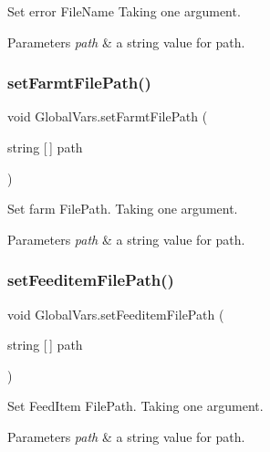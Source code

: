 Set error File\+Name Taking one argument. 


\begin{DoxyParams}{Parameters}
{\em path} & a string value for path. \\
\hline
\end{DoxyParams}
\mbox{\label{class_global_vars_a6467ce1bbcd14765a635d91f4e6618d5}} 
\subsubsection{\texorpdfstring{setFarmtFilePath()}{setFarmtFilePath()}}
{\footnotesize\ttfamily void Global\+Vars.\+set\+Farmt\+File\+Path (\begin{DoxyParamCaption}\item[{string \mbox{[}$\,$\mbox{]}}]{path }\end{DoxyParamCaption})\hspace{0.3cm}{\ttfamily [inline]}}



Set farm File\+Path. Taking one argument. 


\begin{DoxyParams}{Parameters}
{\em path} & a string value for path. \\
\hline
\end{DoxyParams}
\mbox{\label{class_global_vars_a6ca2fb796401a8ef3d42042c2e60a773}} 
\subsubsection{\texorpdfstring{setFeeditemFilePath()}{setFeeditemFilePath()}}
{\footnotesize\ttfamily void Global\+Vars.\+set\+Feeditem\+File\+Path (\begin{DoxyParamCaption}\item[{string \mbox{[}$\,$\mbox{]}}]{path }\end{DoxyParamCaption})\hspace{0.3cm}{\ttfamily [inline]}}



Set Feed\+Item File\+Path. Taking one argument. 


\begin{DoxyParams}{Parameters}
{\em path} & a string value for path. \\
\hline
\end{DoxyParams}
\mbox{\label{class_global_vars_aed3b5ff219e7de5d3b559f94b5c6a6a3}} 
